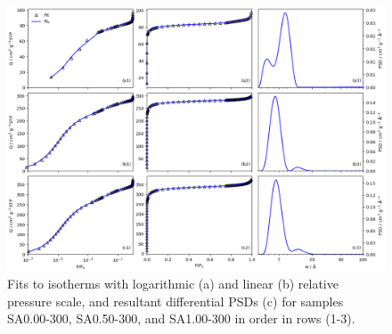 \begin{appendices}
\begin{figure}[p]
    \centering
    \includegraphics[width=\columnwidth, keepaspectratio]{4-impregnation/figs/SAxxx-300_isopsd.png}
    \caption{Fits to  isotherms with logarithmic (a) and linear (b) relative pressure scale, and resultant differential PSDs (c) for samples SA0.00-300, SA0.50-300, and SA1.00-300 in order in rows (1-3).}
    \label{fig:SAxxx-300_isopsd}
\end{figure}


\end{appendices}
